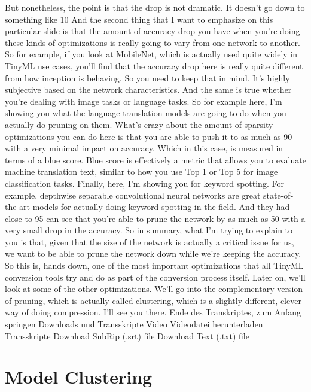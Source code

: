 {{{{{    But nonetheless, the point is that the drop is not dramatic.
    It doesn't go down to something like 10%
    And the second thing that I want to emphasize on this particular slide
    is that the amount of accuracy drop you have
    when you're doing these kinds of optimizations
    is really going to vary from one network to another.
    So for example, if you look at MobileNet, which is actually
    used quite widely in TinyML use cases, you'll
    find that the accuracy drop here is really
    quite different from how inception is behaving.
    So you need to keep that in mind.
    It's highly subjective based on the network characteristics.
    And the same is true whether you're dealing with image tasks or language
    tasks.
    So for example here, I'm showing you what the language translation
    models are going to do when you actually do pruning on them.
    What's crazy about the amount of sparsity optimizations you can do here
    is that you are able to push it to as much as 90%
    with a very minimal impact on accuracy.
    Which in this case, is measured in terms of a blue score.
    Blue score is effectively a metric that allows
    you to evaluate machine translation text, similar to how
    you use Top 1 or Top 5 for image classification tasks.
    Finally, here, I'm showing you for keyword spotting.
    For example, depthwise separable convolutional neural networks are great
    state-of-the-art models for actually doing keyword spotting in the field.
    And they had close to 95%
    can see that you're able to prune the network by as much as 50%
    with a very small drop in the accuracy.
    So in summary, what I'm trying to explain to
    you is that, given that the size of the network
    is actually a critical issue for us, we want
    to be able to prune the network down while we're keeping the accuracy.
    So this is, hands down, one of the most important optimizations
    that all TinyML conversion tools try and do
    as part of the conversion process itself.
    Later on, we'll look at some of the other optimizations.
    We'll go into the complementary version of pruning, which is actually
    called clustering, which is a slightly different, clever way of doing
    compression.
    I'll see you there.
    Ende des Transkriptes, zum Anfang springen
    Downloads und Transskripte
    Video
    Videodatei herunterladen
    Transskripte
    Download SubRip (.srt) file
    Download Text (.txt) file

\section{Model Clustering}

}}}}}

